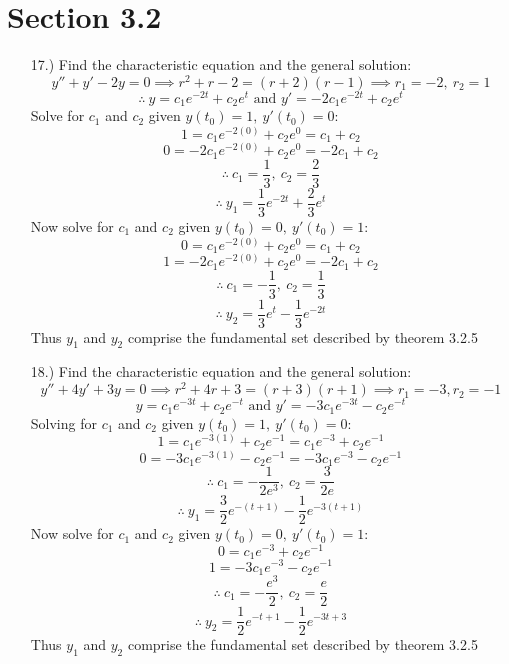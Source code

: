 \documentclass[12pt]{article}
\begin{document}
\pagestyle{fancy}
\fancyhead{}

\normalsize
\section*{Section 3.2}
\begin{itemize}
    \item [17.)] Find the characteristic equation and the general solution:
    \[y''+y'-2y=0\implies r^2+r-2=(r+2)(r-1)\implies r_1=-2,\ r_2=1\]
    \[\therefore\ y=c_1e^{-2t}+c_2e^t\text{ and }y'=-2c_1e^{-2t}+c_2e^t\]
    Solve for $c_1$ and $c_2$ given $y(t_0)=1,\ y'(t_0)=0$:
    \[1=c_1e^{-2(0)}+c_2e^0=c_1+c_2\]
    \[0=-2c_1e^{-2(0)}+c_2e^0=-2c_1+c_2\]
    \[\therefore\ c_1=\frac{1}{3},\ c_2=\frac{2}{3}\]
    \[\therefore\ y_1=\frac{1}{3}e^{-2t}+\frac{2}{3}e^t\]
    Now solve for $c_1$ and $c_2$ given $y(t_0)=0,\ y'(t_0)=1$:
    \[0=c_1e^{-2(0)}+c_2e^0=c_1+c_2\]
    \[1=-2c_1e^{-2(0)}+c_2e^0=-2c_1+c_2\]
    \[\therefore\ c_1=-\frac{1}{3},\ c_2=\frac{1}{3}\]
    \[\therefore\ y_2=\frac{1}{3}e^t-\frac{1}{3}e^{-2t}\]
    Thus $y_1$ and $y_2$ comprise the fundamental set described by theorem 3.2.5

    \item [18.)] Find the characteristic equation and the general solution:
    \[y''+4y'+3y=0\implies r^2+4r+3=(r+3)(r+1)\implies r_1=-3,r_2=-1\]
    \[y=c_1e^{-3t}+c_2e^{-t}\text{ and }y'=-3c_1e^{-3t}-c_2e^{-t}\]
    Solving for $c_1$ and $c_2$ given $y(t_0)=1,\ y'(t_0)=0$:
    \[1=c_1e^{-3(1)}+c_2e^{-1}=c_1e^{-3}+c_2e^{-1}\]
    \[0=-3c_1e^{-3(1)}-c_2e^{-1}=-3c_1e^{-3}-c_2e^{-1}\]
    \[\therefore\ c_1=-\frac{1}{2e^3},\ c_2=\frac{3}{2e}\]
    \[\therefore\ y_1=\frac{3}{2}e^{-(t+1)}-\frac{1}{2}e^{-3(t+1)}\]
    Now solve for $c_1$ and $c_2$ given $y(t_0)=0,\ y'(t_0)=1$:
    \[0=c_1e^{-3}+c_2e^{-1}\]
    \[1=-3c_1e^{-3}-c_2e^{-1}\]
    \[\therefore\ c_1=-\frac{e^3}{2},\ c_2=\frac{e}{2}\]
    \[\therefore\ y_2=\frac{1}{2}e^{-t+1}-\frac{1}{2}e^{-3t+3}\]
    Thus $y_1$ and $y_2$ comprise the fundamental set described by theorem 3.2.5
\end{itemize}
\end{document}
